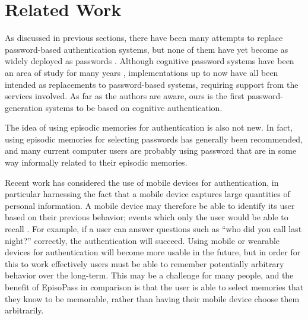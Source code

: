 \documentclass[runningheads,a4paper]{llncs}
\begin{document}
\section{Related Work}


As discussed in previous sections,
there have been many attempts to replace password-based authentication systems,
but none of them have yet become as widely deployed as
passwords \cite{Bonneau:ReplacePasswords}.
%
Although cognitive password systems have been an area of study for 
many years \cite{Lazar2011,Zviran:1990:UAC:100512.100538},
implementations up to now have all been intended as replacements 
to password-based systems, requiring support from the services involved.
As far as the authors are aware, ours is the first password-generation systems to be
based on cognitive authentication.


The idea of using episodic memories for authentication is also not new.
In fact, using episodic memories for selecting passwords
has generally been recommended,
and many current computer users are probably using password that are
in some way informally related to their episodic memories.

Recent work has considered the use of mobile devices for authentication,
in particular harnessing the fact that a mobile device captures large quantities
of personal information. A mobile device may therefore be able to identify
its user based on their previous behavior; events which only the user would be able to recall \cite{Dandapat:2015:AYD:2702123.2702457,Das:2013:ECE:2493432.2493453,GuptaWRLGB12}%
.
For example, if a user can answer questions such as
``who did you call last night?'' correctly, the authentication will succeed.
Using mobile or wearable devices for authentication will become more usable
in the future,
but in order for this to work effectively users must be able to remember potentially
arbitrary behavior over the long-term. This may be a challenge for many people, and the 
benefit of EpisoPass in comparison is that the user is able to select memories that they
know to be memorable, rather than having their mobile device choose them arbitrarily.
\end{document}
